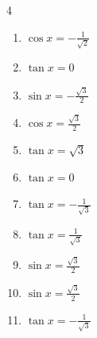 \begin{multicols}{4}
\begin{enumerate}

  \item $\displaystyle \cos{x}  = -\frac{1}{\sqrt{2}}$


  \item $\displaystyle \tan{x}  = 0$


  \item $\displaystyle \sin{x}  = -\frac{\sqrt{3}}{2}$


  \item $\displaystyle \cos{x}  = \frac{\sqrt{3}}{2}$


  \item $\displaystyle \tan{x}  = \sqrt{3}$


  \item $\displaystyle \tan{x}  = 0$


  \item $\displaystyle \tan{x}  = -\frac{1}{\sqrt{3}}$


\columnbreak %

  \item $\displaystyle \tan{x}  = \frac{1}{\sqrt{3}}$


  \item $\displaystyle \sin{x}  = \frac{\sqrt{3}}{2}$


  \item $\displaystyle \sin{x}  = \frac{\sqrt{3}}{2}$


  \item $\displaystyle \tan{x}  = -\frac{1}{\sqrt{3}}$


\end{enumerate}
\end{multicols}
